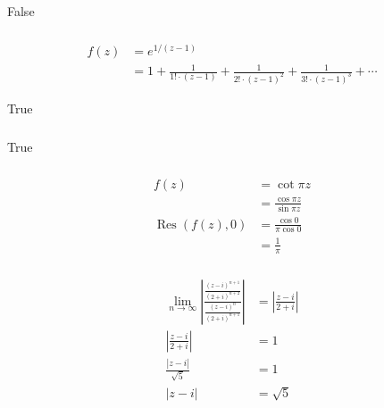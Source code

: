 \documentclass{article}
\newcommand{\Res}{\operatorname{Res}}
\begin{document}
False

\setcounter{subsubsection}{4}
\subsubsection{}

\begin{align*}
  f(z) & = e^{1 / (z - 1)}                                                                                       \\
       & = 1 + \frac{1}{1! \cdot (z - 1)} + \frac{1}{2! \cdot (z - 1)^2} + \frac{1}{3! \cdot (z - 1)^3} + \cdots
\end{align*}

True

\setcounter{subsubsection}{6}
\subsubsection{}

True

\setcounter{subsubsection}{8}
\subsubsection{}

\begin{align*}
  f(z)          & = \cot \pi z                    \\
                & = \frac{\cos \pi z}{\sin \pi z} \\
  \Res(f(z), 0) & = \frac{\cos 0}{\pi \cos 0}     \\
                & = \frac{1}{\pi}
\end{align*}

\setcounter{subsubsection}{10}
\subsubsection{}

\begin{align*}
  \lim_{n \rightarrow \infty} \left| \frac{\frac{(z - i)^{n + 1}}{(2 + i)^{n + 2}}}{\frac{(z - i)^n}{(2 + i)^{n + 1}}} \right| & = \left| \frac{z - i}{2 + i} \right| \\
  \left| \frac{z - i}{2 + i} \right|                                                                                           & = 1                                  \\
  \frac{|z - i|}{\sqrt{5}}                                                                                                     & = 1                                  \\
  |z - i|                                                                                                                      & = \sqrt{5}
\end{align*}
\end{document}
